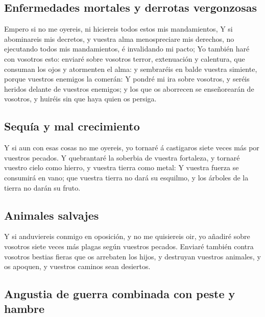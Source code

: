 \hypertarget{enfermedades-mortales-y-derrotas-vergonzosas}{%
\subsection{Enfermedades mortales y derrotas
vergonzosas}\label{enfermedades-mortales-y-derrotas-vergonzosas}}

 Empero si no me oyereis, ni hiciereis todos estos mis
mandamientos,  Y si abominareis mis decretos, y vuestra
alma menospreciare mis derechos, no ejecutando todos mis mandamientos, é
invalidando mi pacto;  Yo también haré con vosotros esto:
enviaré sobre vosotros terror, extenuación y calentura, que consuman los
ojos y atormenten el alma: y sembraréis en balde vuestra simiente,
porque vuestros enemigos la comerán:  Y pondré mi ira
sobre vosotros, y seréis heridos delante de vuestros enemigos; y los que
os aborrecen se enseñorearán de vosotros, y huiréis sin que haya quien
os persiga.

\hypertarget{sequuxeda-y-mal-crecimiento}{%
\subsection{Sequía y mal
crecimiento}\label{sequuxeda-y-mal-crecimiento}}

 Y si aun con esas cosas no me oyereis, yo tornaré á
castigaros siete veces más por vuestros pecados.  Y
quebrantaré la soberbia de vuestra fortaleza, y tornaré vuestro cielo
como hierro, y vuestra tierra como metal:  Y vuestra
fuerza se consumirá en vano; que vuestra tierra no dará su esquilmo, y
los árboles de la tierra no darán su fruto.

\hypertarget{animales-salvajes}{%
\subsection{Animales salvajes}\label{animales-salvajes}}

 Y si anduviereis conmigo en oposición, y no me
quisiereis oir, yo añadiré sobre vosotros siete veces más plagas según
vuestros pecados.  Enviaré también contra vosotros
bestias fieras que os arrebaten los hijos, y destruyan vuestros
animales, y os apoquen, y vuestros caminos sean desiertos.

\hypertarget{angustia-de-guerra-combinada-con-peste-y-hambre}{%
\subsection{Angustia de guerra combinada con peste y
hambre}\label{angustia-de-guerra-combinada-con-peste-y-hambre}}

